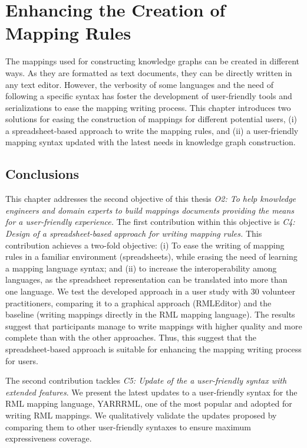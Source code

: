 
\chapter{Enhancing the Creation of Mapping Rules}
\label{chapter:creation}

The mappings used for constructing knowledge graphs can be created in different ways. As they are formatted as text documents, they can be directly written in any text editor. However, the verbosity of some languages and the need of following a specific syntax has foster the development of user-friendly tools and serializations to ease the mapping writing process. This chapter introduces two solutions for easing the construction of mappings for different potential users, (i) a spreadsheet-based approach to write the mapping rules, and (ii) a user-friendly mapping syntax updated with the latest needs in knowledge graph construction.





\section{Conclusions}

This chapter addresses the second objective of this thesis \textit{O2: To help knowledge engineers and domain experts to build mappings documents providing the means for a user-friendly experience.}
The first contribution within this objective is \textit{C4: Design of a spreadsheet-based approach for writing mapping rules.} This contribution achieves a two-fold objective: (i) To ease the writing of mapping rules in a familiar environment (spreadsheets), while erasing the need of learning a mapping language syntax; and (ii) to increase the interoperability among languages, as the spreadsheet representation can be translated into more than one language. We test the developed approach in a user study with 30 volunteer practitioners, comparing it to a graphical approach (RMLEditor) and the baseline (writing mappings directly in the RML mapping language). The results suggest that participants manage to write mappings with higher quality and more complete than with the other approaches. Thus, this suggest that the spreadsheet-based approach is suitable for enhancing the mapping writing process for users. 

The second contribution tackles \textit{C5: Update of the a user-friendly syntax with extended features}. 
We present the latest updates to a user-friendly syntax for the RML mapping language, YARRRML, one of the most popular and adopted for writing RML mappings. 
We qualitatively validate the updates proposed by comparing them to other user-friendly syntaxes to ensure maximum expressiveness coverage. 

